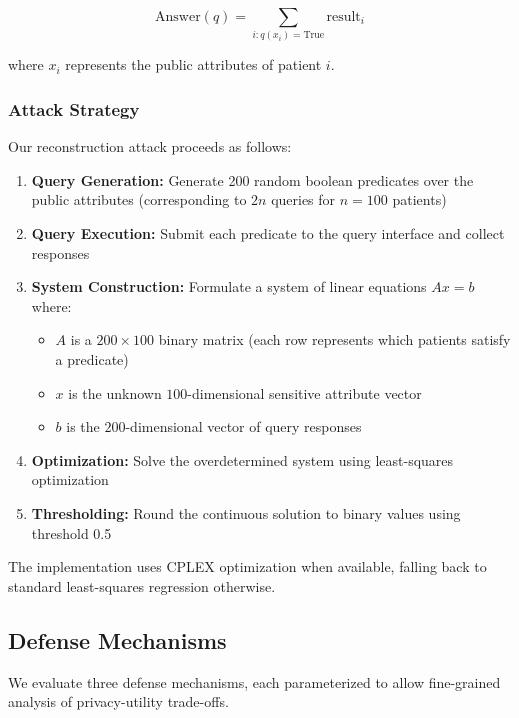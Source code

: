 \documentclass[11pt,letterpaper]{article}
\begin{document}
\begin{equation}
    \text{Answer}(q) = \sum_{i: q(x_i) = \text{True}} \text{result}_i
\end{equation}

where $x_i$ represents the public attributes of patient $i$.

\subsubsection{Attack Strategy}

Our reconstruction attack proceeds as follows:

\begin{enumerate}[leftmargin=*]
    \item \textbf{Query Generation:} Generate 200 random boolean predicates over the public attributes (corresponding to $2n$ queries for $n=100$ patients)
    \item \textbf{Query Execution:} Submit each predicate to the query interface and collect responses
    \item \textbf{System Construction:} Formulate a system of linear equations $Ax = b$ where:
    \begin{itemize}
        \item $A$ is a $200 \times 100$ binary matrix (each row represents which patients satisfy a predicate)
        \item $x$ is the unknown $100$-dimensional sensitive attribute vector
        \item $b$ is the $200$-dimensional vector of query responses
    \end{itemize}
    \item \textbf{Optimization:} Solve the overdetermined system using least-squares optimization
    \item \textbf{Thresholding:} Round the continuous solution to binary values using threshold 0.5
\end{enumerate}

The implementation uses CPLEX optimization when available, falling back to standard least-squares regression otherwise.

\subsection{Defense Mechanisms}

We evaluate three defense mechanisms, each parameterized to allow fine-grained analysis of privacy-utility trade-offs.
\end{document}
